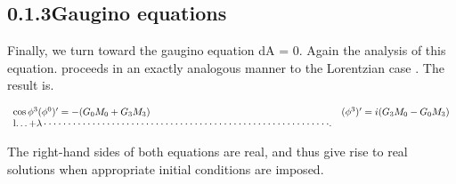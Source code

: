 \documentclass{article}
\begin{document}
\subsection*{0.1.3Gaugino equations}


Finally, we turn toward the gaugino equation dA = 0. Again the analysis of this equation.
proceeds in an exactly analogous manner to the Lorentzian case . The result is.


\begin{equation}
\begin{array}{l l}{{\cos\phi^{3}(\phi^{0})^{\prime}=-(G_{0}M_{0}+G_{3}M_{3})}}&{{(\phi^{3})^{\prime}=i(G_{3}M_{0}-G_{0}M_{3})}}\\ {{\operatorname{l...+\lambda}\cdot\cdot\cdot\cdot\cdot\cdot\cdot\cdot\cdot\cdot\cdot\cdot\cdot\cdot\cdot\cdot\cdot\cdot\cdot\cdot\cdot\cdot\cdot\cdot\cdot\cdot\cdot\cdot\cdot\cdot\cdot\cdot\cdot\cdot\cdot\cdot\cdot\cdot\cdot\cdot\cdot\cdot\cdot\cdot\cdot\cdot\cdot\cdot\cdot\cdot\cdot\cdot\cdot\cdot\cdot\cdot\cdot\cdot\cdot.}}\end{array}
\end{equation}


The right-hand sides of both equations are real, and thus give rise to real solutions when
appropriate initial conditions are imposed.
\end{document}
